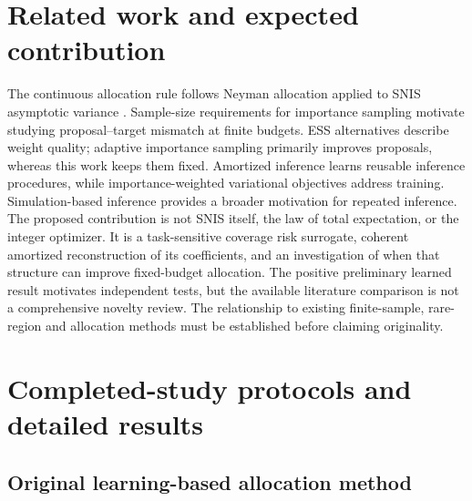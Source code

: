 \documentclass[10pt,letterpaper]{article}
\begin{document}
\section{Related work and expected contribution}
The continuous allocation rule follows Neyman allocation \cite{neyman1934} applied to SNIS asymptotic variance \cite{owen2013}. Sample-size requirements for importance sampling \cite{chatterjee2018} motivate studying proposal--target mismatch at finite budgets. ESS alternatives \cite{martino2017} describe weight quality; adaptive importance sampling \cite{bugallo2017} primarily improves proposals, whereas this work keeps them fixed. Amortized inference \cite{gershman2014,cremer2018} learns reusable inference procedures, while importance-weighted variational objectives \cite{burda2016,rainforth2018,tucker2019} address training. Simulation-based inference \cite{cranmer2020} provides a broader motivation for repeated inference. The proposed contribution is not SNIS itself, the law of total expectation, or the integer optimizer. It is a task-sensitive coverage risk surrogate, coherent amortized reconstruction of its coefficients, and an investigation of when that structure can improve fixed-budget allocation. The positive preliminary learned result motivates independent tests, but the available literature comparison is not a comprehensive novelty review. The relationship to existing finite-sample, rare-region and allocation methods must be established before claiming originality.
\clearpage
\appendix
\section{Completed-study protocols and detailed results}\label{app:protocol}
\subsection{Original learning-based allocation method}
\end{document}
